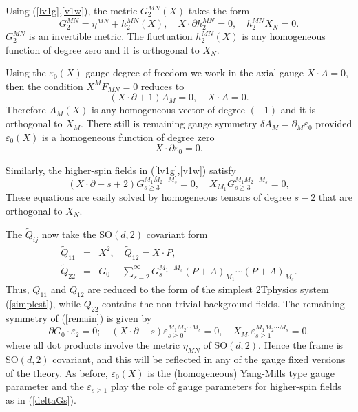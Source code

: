 \documentclass[a4paper,12pt]{article}
\begin{document}
Using (\ref{lv1g},\ref{v1w}), the metric $G_{2}^{MN}\left( X\right) $ takes
the form
\begin{equation}
G_{2}^{MN}=\eta ^{MN}+h_{2}^{MN}\left( X\right) ,\quad X\cdot \partial
h_{2}^{MN}=0,\quad h_{2}^{MN}X_{N}=0.
\end{equation}
$G_{2}^{MN}$ is an invertible metric. The fluctuation $h_{2}^{MN}\left(
X\right) $ is any homogeneous function of degree zero and it is orthogonal
to $X_{N}.$

Using the $\varepsilon _{0}\left( X\right) $ gauge degree of freedom we work
in the axial gauge $X\cdot A=0,$ then the condition $X^{M}F_{MN}=0$ reduces
to
\begin{equation}
\left( X\cdot \partial +1\right) A_{M}=0,\quad X\cdot A=0.
\end{equation}
Therefore $A_{M}\left( X\right) $ is any homogeneous vector of degree $%
\left( -1\right) $ and it is orthogonal to $X_{M}.$ There still is remaining
gauge symmetry $\delta A_{M}=\partial _{M}\varepsilon _{0}$ provided $%
\varepsilon _{0}\left( X\right) $ is a homogeneous function of degree zero
\begin{equation}
X\cdot \partial \varepsilon _{0}=0.
\end{equation}

Similarly, the higher-spin fields in (\ref{lv1g},\ref{v1w}) satisfy
\begin{equation}
\left( X\cdot \partial -s+2\right) G_{s\geq 3}^{M_{1}M_{2}\cdots
M_{s}}=0,\quad X_{M_{1}}G_{s\geq 3}^{M_{1}M_{2}\cdots M_{s}}=0,
\end{equation}
These equations are easily solved by homogeneous tensors of degree $s-2$
that are orthogonal to $X_{N}.$

The $\tilde{Q}_{ij}$ now take the SO$\left( d,2\right) $ covariant form
\begin{eqnarray}
\tilde{Q}_{11} &=&X^{2},\quad \tilde{Q}_{12}=X\cdot P, \\
\tilde{Q}_{22} &=&G_{0}+\sum_{s=2}^{\infty }G_{s}^{M_{1}\cdots M_{s}}\left(
P+A\right) _{M_{1}}\cdots \left( P+A\right) _{M_{s}}.
\end{eqnarray}
Thus, $Q_{11}$ and $Q_{12}$ are reduced to the form of the simplest
2Tphysics system (\ref{simplest}), while $Q_{22}$ contains the non-trivial
background fields. The remaining symmetry of (\ref{remain}) is given by
\begin{equation}
\partial G_{0}\cdot \varepsilon _{2}=0;\quad \left( X\cdot \partial
-s\right) \varepsilon _{s\geq 0}^{M_{1}M_{2}\cdots M_{s}}=0,\quad
X_{M_{1}}\varepsilon _{s\geq 1}^{M_{1}M_{2}\cdots M_{s}}=0.  \label{remaine}
\end{equation}
where all dot products involve the metric $\eta _{MN}$ of SO$\left(
d,2\right) .$ Hence the frame is SO$\left( d,2\right) $ covariant, and this
will be reflected in any of the gauge fixed versions of the theory. As
before, $\varepsilon _{0}\left( X\right) $ is the (homogeneous) Yang-Mills
type gauge parameter and the $\varepsilon _{s\geq 1}$ play the role of gauge
parameters for higher-spin fields as in (\ref{deltaGs}).
\end{document}
